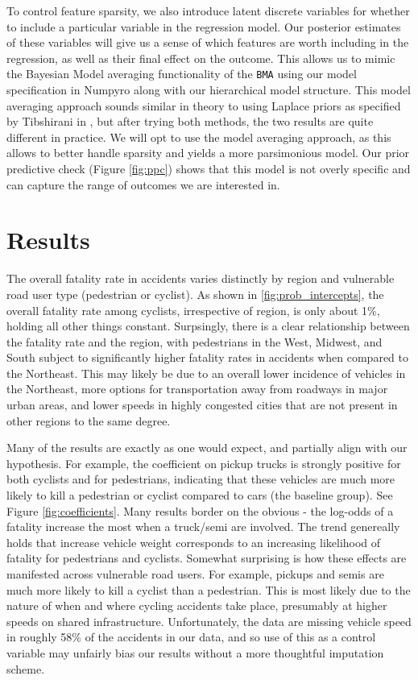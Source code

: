 \documentclass[12pt]{article}
\begin{document}
To control feature sparsity, we also introduce latent discrete variables for whether to include a particular
variable in the regression model. Our posterior estimates of these variables will give us a sense of which features
are worth including in the regression, as well as their final effect on the outcome. This allows us to mimic the
Bayesian Model averaging functionality of the \texttt{BMA}\cite{raftery_bma_2022} using our model specification in
Numpyro\cite{phan_composable_2019} along with our hierarchical model structure. This model averaging approach sounds
similar in theory to using Laplace priors as specified by Tibshirani in \cite{tibshirani_regression_1996},
but after trying both methods, the two results are quite different in practice. We will opt to use the model
averaging approach, as this allows to better handle sparsity and yields a more parsimonious model.
Our prior predictive check (Figure \ref{fig:ppc}) shows that this model is not overly specific and can capture the
range of outcomes we are interested in.

\section{Results}

The overall fatality rate in accidents varies distinctly by region and vulnerable road user
type (pedestrian or cyclist). As shown in \ref{fig:prob_intercepts}, the overall fatality rate
among cyclists, irrespective of region, is only about 1\%, holding all other things constant. Surpsingly,
there is a clear relationship between the fatality rate and the region, with pedestrians in the West, Midwest, and South
subject to significantly higher fatality rates in accidents when compared to the Northeast. This may likely
be due to an overall lower incidence of vehicles in the Northeast, more options for transportation away from roadways
in major urban areas, and lower speeds in highly congested cities that are not present in other regions to the
same degree.

Many of the results are exactly as one would expect, and partially align with our hypothesis. For example, the
coefficient on pickup trucks is strongly positive for both cyclists and for pedestrians, indicating that these vehicles
are much more likely to kill a pedestrian or cyclist compared to cars (the baseline group). See
Figure \ref{fig:coefficients}. Many results border on the obvious - the log-odds of a fatality increase the most when
a truck/semi are involved. The trend genereally holds that increase vehicle weight corresponds to an increasing
likelihood of fatality for pedestrians and cyclists. Somewhat surprising is how these effects are manifested across
vulnerable road users. For example, pickups and semis are much more likely to kill a cyclist than a pedestrian. This is
most likely due to the nature of when and where cycling accidents take place, presumably at higher speeds on shared
infrastructure. Unfortunately, the data are missing vehicle speed in roughly 58\% of the accidents in our data, and so
use of this as a control variable may unfairly bias our results without a more thoughtful imputation scheme.
\end{document}
